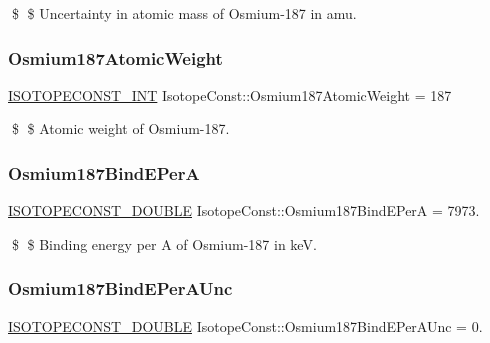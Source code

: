 \$ \$ Uncertainty in atomic mass of Osmium-\/187 in amu. \mbox{\label{group___isotope_const-_osmium-_os187_ga48ef65d9ed8594629f8ee2173a8dc796}} 
\subsubsection{\texorpdfstring{Osmium187\+Atomic\+Weight}{Osmium187AtomicWeight}}
{\footnotesize\ttfamily \mbox{\hyperlink{group___isotope_const-_macros_ga5f18360b3e99483a35c32d789e62621c}{I\+S\+O\+T\+O\+P\+E\+C\+O\+N\+S\+T\+\_\+\+I\+NT}} Isotope\+Const\+::\+Osmium187\+Atomic\+Weight = 187}

\$ \$ Atomic weight of Osmium-\/187. \mbox{\label{group___isotope_const-_osmium-_os187_ga671d2551b843a53bbc3f4e648b5ca1fe}} 
\subsubsection{\texorpdfstring{Osmium187\+Bind\+E\+PerA}{Osmium187BindEPerA}}
{\footnotesize\ttfamily \mbox{\hyperlink{group___isotope_const-_macros_ga8f45a7272ce02c0b4c65c44636ed719a}{I\+S\+O\+T\+O\+P\+E\+C\+O\+N\+S\+T\+\_\+\+D\+O\+U\+B\+LE}} Isotope\+Const\+::\+Osmium187\+Bind\+E\+PerA = 7973.}

\$ \$ Binding energy per A of Osmium-\/187 in keV. \mbox{\label{group___isotope_const-_osmium-_os187_ga8413ae57e85da5b32da4659d0a3f8947}} 
\subsubsection{\texorpdfstring{Osmium187\+Bind\+E\+Per\+A\+Unc}{Osmium187BindEPerAUnc}}
{\footnotesize\ttfamily \mbox{\hyperlink{group___isotope_const-_macros_ga8f45a7272ce02c0b4c65c44636ed719a}{I\+S\+O\+T\+O\+P\+E\+C\+O\+N\+S\+T\+\_\+\+D\+O\+U\+B\+LE}} Isotope\+Const\+::\+Osmium187\+Bind\+E\+Per\+A\+Unc = 0.}

